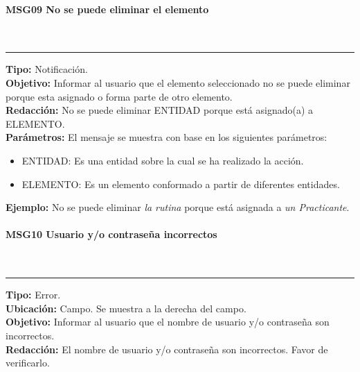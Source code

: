 \paragraph{\textcolor[rgb]{0, 0, 0.545098}{MSG09 No se puede eliminar el elemento}} \hspace{1cm} \\
\label{msj:MSG09}
\rule[3mm]{16.59cm}{0.1mm} \vspace{1mm}
\textbf{Tipo:} Notificación.\\
\textbf{Objetivo:} Informar al usuario que el elemento seleccionado no se puede eliminar porque esta asignado o forma parte de otro elemento.\\
\textbf{Redacción:} No se puede eliminar ENTIDAD porque está asignado(a) a ELEMENTO.\\
\textbf{Parámetros:} El mensaje se muestra con base en los siguientes parámetros:
\begin{itemize} \itemsep1pt \parskip0pt 
	\item ENTIDAD: Es una entidad sobre la cual se ha realizado la acción.
	\item ELEMENTO: Es un elemento conformado a partir de diferentes entidades.
\end{itemize}
\textbf{Ejemplo:} No se puede eliminar \textit{la rutina} porque está asignada a \textit{un Practicante}.\\

\paragraph{\textcolor[rgb]{0, 0, 0.545098}{MSG10 Usuario y/o contraseña incorrectos}} \hspace{1cm} \\
\label{msj:MSG10}
\rule[3mm]{16.59cm}{0.1mm} \vspace{1mm}
\textbf{Tipo:} Error.\\
\textbf{Ubicación:} Campo. Se muestra a la derecha del campo.\\
\textbf{Objetivo:} Informar al usuario que el nombre de usuario y/o contraseña son incorrectos.\\
\textbf{Redacción:} El nombre de usuario y/o contraseña son incorrectos. Favor de verificarlo.\\

